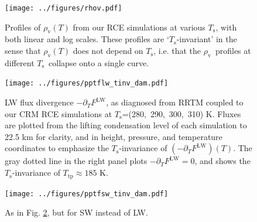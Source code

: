 \documentclass[10pt]{article}
\newcommand{\ppt}{\ensuremath{\partial_T}}
\newcommand{\FLW}{\ensuremath{F^\mathrm{LW}}}
\newcommand{\rhov}{\ensuremath{\rho_\mathrm{v}}}
\newcommand{\Ts}{\ensuremath{T_\mathrm{s}}}
\newcommand{\Ttp}{\ensuremath{T_\mathrm{tp}}}
\begin{document}
\begin{figure}[h]
	\begin{center}
			\texttt{[image: ../figures/rhov.pdf]}
		\caption{Profiles of $\rhov(T)$ from our RCE simulations at various \Ts, with both linear and log scales. These profiles are `\Ts-invariant' in the sense that $\rhov(T)$ does not depend on \Ts, i.e. that the \rhov\ profiles at different \Ts\ collapse onto a single curve.
		\label{rhov_fig}
		}
	\end{center}
\end{figure}



\begin{figure}[h]
	\begin{center}
			\texttt{[image: ../figures/pptflw\_tinv\_dam.pdf]}
		\caption{LW flux divergence  $-\ppt \FLW$, as diagnosed from RRTM coupled to our CRM RCE simulations at \Ts=(280,\ 290,\ 300,\ 310) K. Fluxes are plotted from the lifting condensation level of each simulation to 22.5 km for clarity, and  in height, pressure, and temperature coordinates to emphasize the \Ts-invariance of  $(-\ppt \FLW)(T)$. The gray dotted line in the right panel plots $-\ppt \FLW = 0$, and shows the \Ts-invariance of $\Ttp \approx 185$ K.
		\label{pptflw_tinv_dam}
		}
	\end{center}
\end{figure}

\begin{figure}[h]
	\begin{center}
			\texttt{[image: ../figures/pptfsw\_tinv\_dam.pdf]}
		\caption{As in Fig. \ref{pptflw_tinv_dam}, but for SW instead of LW.
		\label{pptfsw_tinv_dam}
		}
	\end{center}
\end{figure}
\end{document}
